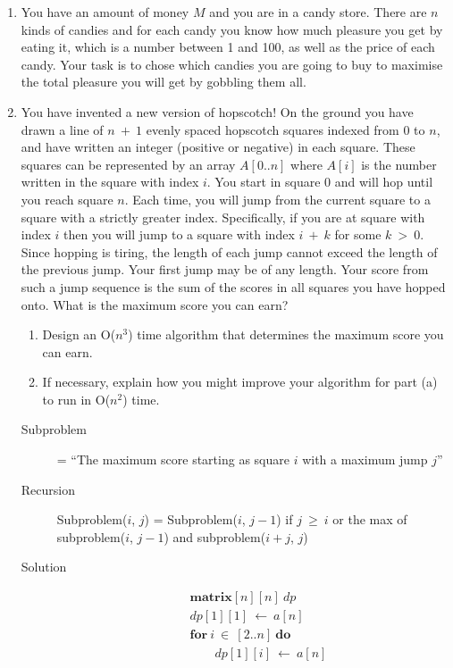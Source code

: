 \documentclass[a4paper]{article}
\begin{document}
\begin{enumerate}
				\item You have an amount of money $M$ and you are in a candy store. There are $n$ kinds of candies and for each candy you know how much pleasure you get by eating it, which is a number between 1 and 100, as well as the price of each candy. Your task is to chose which candies you are going to buy to maximise the total pleasure you will get by gobbling them all.
				\clearpage
				\item You have invented a new version of hopscotch! On the ground you have drawn a line of $n\ +\ 1$ evenly spaced hopscotch squares indexed from $0$ to $n$, and have written an integer (positive or negative) in each square. These squares can be represented by an array $A[0..n]$ where $A[i]$ is the number written in the square with index $i$. You start in square $0$ and will hop until you reach square $n$. Each time, you will jump from the current square to a square with a strictly greater index. Specifically, if you are at square with index $i$ then you will jump to a square with index $i\ +\ k$ for some $k\ >\ 0$. Since hopping is tiring, the length of each jump cannot exceed the length of the previous jump. Your first jump may be of any length. Your score from such a jump sequence is the sum of the scores in all squares you have hopped onto. What is the maximum score you can earn?
						\begin{enumerate}
								\item Design an O($n^3$) time algorithm that determines the maximum score you can earn.
								\item If necessary, explain how you might improve your algorithm for part (a) to run in O($n^2$) time.
						\end{enumerate}
						\begin{description}
								\item[Subproblem] = ``The maximum score starting as square $i$ with a maximum jump $j$''
								\item[Recursion] Subproblem($i$, $j$) = Subproblem($i$, $j-1$) if $j\ \geq\ i$ or the max of subproblem($i$, $j-1$) and subproblem($i+j$, $j$)
								\item[Solution]
										\begin{align*}
												&\textbf{matrix}[n][n]\ \textit{dp}\\
												&\textit{dp}[1][1]\ \gets\ a[n]\\
												&\textbf{for}\ i\ \in\ [2..n]\ \textbf{do} \\
												&\qquad\textit{dp}[1][i]\ \gets\ a[n] \\

\end{align*}
\end{description}
\end{enumerate}
\end{document}
